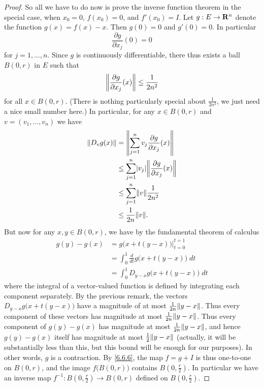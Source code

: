 \begin{proof}
  So all we have to do now is prove the inverse function theorem in the special case, when \(x_0 = 0\), \(f(x_0) = 0\), and \(f'(x_0) = I\).
  Let \(g : E \to \R^n\) denote the function \(g(x) = f(x) - x\).
  Then \(g(0) = 0\) and \(g'(0) = 0\).
  In particular
  \[
    \frac{\partial g}{\partial x_j}(0) = 0
  \]
  for \(j = 1, \dots, n\).
  Since \(g\) is continuously differentiable, there thus exists a ball \(B(0, r)\) in \(E\) such that
  \[
    \norm*{\frac{\partial g}{\partial x_j}(x)} \leq \frac{1}{2 n^2}
  \]
  for all \(x \in B(0, r)\).
  (There is nothing particularly special about \(\frac{1}{2 n^2}\), we just need a nice small number here.)
  In particular, for any \(x \in B(0, r)\) and \(v = (v_1, \dots, v_n)\) we have
  \begin{align*}
    \norm*{D_v g(x)} & = \norm*{\sum_{j = 1}^n v_j \frac{\partial g}{\partial x_j} (x)}         \\
                     & \leq \sum_{j = 1}^n \abs{v_j} \norm*{\frac{\partial g}{\partial x_j}(x)} \\
                     & \leq \sum_{j = 1}^n \norm*{v} \frac{1}{2 n^2}                            \\
                     & \leq \frac{1}{2n} \norm*{v}.
  \end{align*}
  But now for any \(x, y \in B(0, r)\), we have by the fundamental theorem of calculus
  \begin{align*}
    g(y) - g(x) & = g\big(x + t(y - x)\big) \big|_{t = 0}^{t = 1}       \\
                & = \int_0^1 \frac{d}{dt} g\big(x + t(y - x)\big) \; dt \\
                & = \int_0^1 D_{y - x} g\big(x + t(y - x)\big) \; dt
  \end{align*}
  where the integral of a vector-valued function is defined by integrating each component separately.
  By the previous remark, the vectors \(D_{y - x} g\big(x + t(y - x)\big)\) have a magnitude of at most \(\frac{1}{2n} \norm*{y - x}\).
  Thus every component of these vectors has magnitude at most \(\frac{1}{2n} \norm*{y - x}\).
  Thus every component of \(g(y) - g(x)\) has magnitude at most \(\frac{1}{2n} \norm*{y - x}\), and hence \(g(y) - g(x)\) itself has magnitude at most \(\frac{1}{2} \norm*{y - x}\)
  (actually, it will be substantially less than this, but this bound will be enough for our purposes).
  In other words, \(g\) is a contraction.
  By \cref{6.6.6}, the map \(f = g + I\) is thus one-to-one on \(B(0, r)\), and the image \(f\big(B(0, r)\big)\) contains \(B(0, \frac{r}{2})\).
  In particular we have an inverse map \(f^{-1} : B(0, \frac{r}{2}) \to B(0, r)\) defined on \(B(0, \frac{r}{2})\).


\end{proof}
